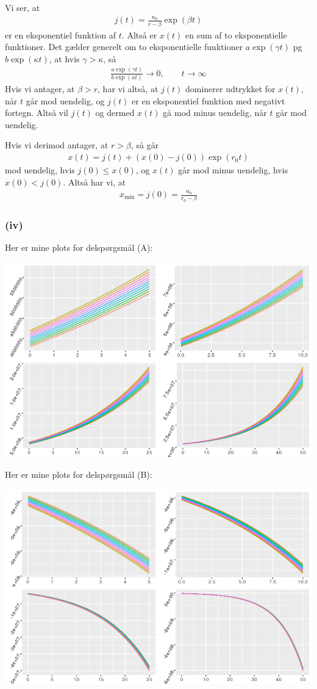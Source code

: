 \documentclass[12pt]{article}
\begin{document}
Vi ser, at 
\begin{align}
j(t) = \frac{u_0 }{r - \beta} \exp(\beta t)
\end{align}
er en eksponentiel funktion af $t$. Altså er $x(t)$ en sum af to eksponentielle funktioner. Det gælder generelt om to eksponentielle funktioner $a \exp(\gamma t)$ pg $b \exp(\kappa t)$, at hvis $\gamma > \kappa$, så
\begin{align}
\frac{a \exp(\gamma t)}{b\exp(\kappa t)} \to 0, \qquad t\to \infty
\end{align}
Hvis vi antager, at $\beta > r$, har vi altså, at $j(t)$ dominerer udtrykket for $x(t)$, når $t$ går mod uendelig, og $j(t)$ er en eksponentiel funktion med negativt fortegn. Altså vil $j(t)$ og dermed $x(t)$ gå mod minus uendelig, når $t$ går mod uendelig. 

Hvis vi derimod antager, at $r > \beta$, så går
\begin{align}
x(t) = j(t) + (x(0) - j(0))\exp(r_0t)
\end{align}
mod uendelig, hvis $j(0) \leq x(0)$, og $x(t)$ går mod minus uendelig, hvis $x(0) < j(0)$. Altså har vi, at
\begin{align}
x_{\min} = j(0) = \frac{u_0 }{r_0 - \beta}
\end{align}

\subsubsection{(iv)}

Her er mine plots for delspørgsmål (A):
\begin{center}
\includegraphics[scale=0.5]{q3p5.png}
\end{center}

Her er mine plots for delspørgsmål (B):
\begin{center}
\includegraphics[scale=0.5]{q3p6.png}
\end{center}
\end{document}
